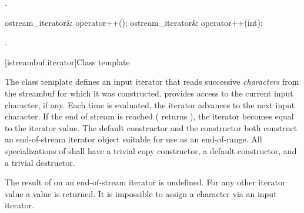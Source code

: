\begin{itemdescr}
\pnum
\returns
{}.
\end{itemdescr}

%
\begin{itemdecl}
ostream_iterator& operator++();
ostream_iterator& operator++(int);
\end{itemdecl}

\begin{itemdescr}
\pnum
\returns
{}.
\end{itemdescr}

[istreambuf.iterator]{Class template }

\pnum
The
class template
defines an input iterator that
reads successive
\textit{characters}
from the streambuf for which it was constructed.
provides access to the current input character, if any.
Each time
is evaluated, the iterator advances to the next input character.
If the end of stream is reached ( returns
),
the iterator becomes equal to the
iterator value.
The default constructor
and the constructor
both construct an end-of-stream iterator object suitable for use
as an end-of-range.
All specializations of  shall have a trivial copy
constructor, a  default constructor, and a trivial destructor.

\pnum
The result of
on an end-of-stream iterator is undefined.
%
For any other iterator value a
value is returned.
It is impossible to assign a character via an input iterator.

